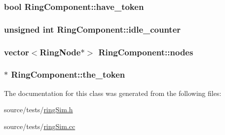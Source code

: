 \hypertarget{classRingComponent_0bb078fae44444ad14cc8cdcccf2b10d}{
\subsubsection[{have\_\-token}]{\setlength{\rightskip}{0pt plus 5cm}bool {\bf RingComponent::have\_\-token}}}
\label{classRingComponent_0bb078fae44444ad14cc8cdcccf2b10d}


\hypertarget{classRingComponent_626741c90d660ecb9724d157d082358b}{
\subsubsection[{idle\_\-counter}]{\setlength{\rightskip}{0pt plus 5cm}unsigned int {\bf RingComponent::idle\_\-counter}}}
\label{classRingComponent_626741c90d660ecb9724d157d082358b}


\hypertarget{classRingComponent_22fec1a57c9a1e34633e94052dbe0ec0}{
\subsubsection[{nodes}]{\setlength{\rightskip}{0pt plus 5cm}vector$<${\bf RingNode}$\ast$$>$ {\bf RingComponent::nodes}}}
\label{classRingComponent_22fec1a57c9a1e34633e94052dbe0ec0}


\hypertarget{classRingComponent_707b2902f6ade01455d59dfee169481e}{
\subsubsection[{the\_\-token}]{$\ast$ {\bf RingComponent::the\_\-token}}}
\label{classRingComponent_707b2902f6ade01455d59dfee169481e}




The documentation for this class was generated from the following files:\begin{CompactItemize}
\item 
source/tests/\hyperlink{ringSim_8h}{ringSim.h}\item 
source/tests/\hyperlink{ringSim_8cc}{ringSim.cc}\end{CompactItemize}
